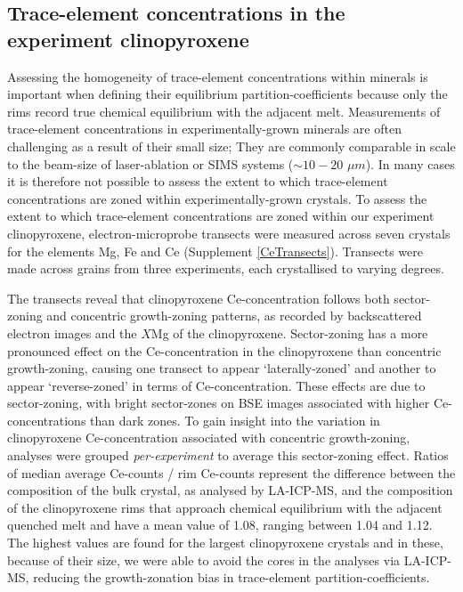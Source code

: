 \documentclass[review,authoryear,12pt]{elsarticle}
\begin{document}
\newpage

\subsection{Trace-element concentrations in the experiment clinopyroxene}
Assessing the homogeneity of trace-element concentrations within minerals is important when defining their equilibrium partition-coefficients because only the rims record true chemical equilibrium with the adjacent melt.
    Measurements of trace-element concentrations in experimentally-grown minerals are often challenging as a result of their small size; They are commonly comparable in scale to the beam-size of laser-ablation or SIMS systems ($\sim 10-20$ $ \mu m$). In many cases it is therefore not possible to assess the extent to which trace-element concentrations are zoned within experimentally-grown crystals.
To assess the extent to which trace-element concentrations are zoned within our experiment clinopyroxene, electron-microprobe transects were measured across seven crystals for the elements Mg, Fe and Ce (Supplement \ref{CeTransects}). Transects were made across grains from three experiments, each crystallised to varying degrees.

The transects reveal that clinopyroxene Ce-concentration follows both sector-zoning and concentric growth-zoning patterns, as recorded by backscattered electron images and the $X$Mg of the clinopyroxene. Sector-zoning has a more pronounced effect on the Ce-concentration in the clinopyroxene than concentric growth-zoning, causing one transect to appear `laterally-zoned' and another to appear `reverse-zoned' in terms of Ce-concentration. These effects are due to sector-zoning, with bright sector-zones on BSE images associated with higher Ce-concentrations than dark zones.
    To gain insight into the variation in clinopyroxene Ce-concentration associated with concentric growth-zoning, analyses were grouped \textit{per-experiment} to average this sector-zoning effect. 
Ratios of median average Ce-counts / rim Ce-counts represent the difference between the composition of the bulk crystal, as analysed by LA-ICP-MS, and the composition of the clinopyroxene rims that approach chemical equilibrium with the adjacent quenched melt and have a mean value of 1.08, ranging between 1.04 and 1.12. The highest values are found for the largest clinopyroxene crystals and in these, because of their size, we were able to avoid the cores in the analyses via LA-ICP-MS, reducing the growth-zonation bias in trace-element partition-coefficients.
   
\end{document}
